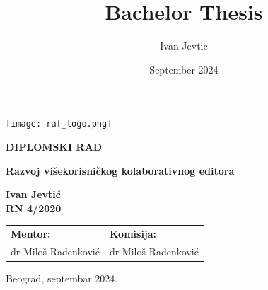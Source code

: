 \documentclass[12pt]{article}
\title{Bachelor Thesis}
\author{Ivan Jevtic}
\date{September 2024}
\begin{document}
   \begin{titlepage}
      \begin{center}
         
         \vspace*{-1in}
         \texttt{[image: raf\_logo.png]}

         \vspace{1in}
         \Large
         \textbf{DIPLOMSKI RAD}
         
         \vspace{1in}
         \Huge
         \textbf{Razvoj višekorisničkog kolaborativnog editora}
         
         \vspace{1in}


         \fontsize{14pt}{18pt}\selectfont
         \textbf{Ivan Jevtić} \\
         \textbf{RN 4/2020}
         \vspace*{1.5in}
         
         \begin{center}
            \normalsize
            \begin{tabular}{p{} p{}}
               \fontsize{14pt}{18pt}\selectfont   
               \textbf{Mentor:} & 
            
               \fontsize{14pt}{18pt}\selectfont
               \textbf{Komisija:} \\
               dr Miloš Radenković & dr Miloš Radenković \\
                                 
            \end{tabular}
         \end{center}

         \vspace*{\fill}

         \normalsize
         Beograd, septembar 2024.


         
      \end{center}
   \end{titlepage}
   \restoregeometry %

   \newpage
   
\end{document}
